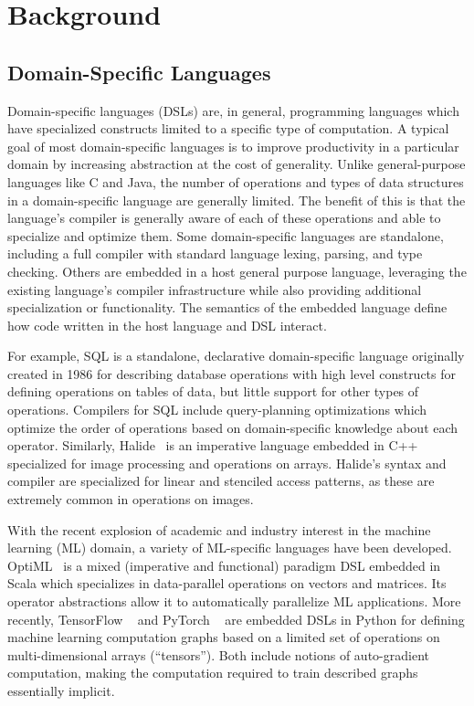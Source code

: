\chapter{Background}
\label{background}

\section{Domain-Specific Languages}
Domain-specific languages (DSLs) are, in general, programming languages which have specialized
constructs limited to a specific type of computation. A typical goal of
most domain-specific languages is to improve productivity in a particular domain
by increasing abstraction at the cost of generality. Unlike general-purpose languages like C and Java,
the number of operations and types of data structures in a domain-specific language
are generally limited. The benefit of this is that the language's compiler is
generally aware of each of these operations and able to specialize and optimize them.
Some domain-specific languages are standalone, including a full compiler with standard language
lexing, parsing, and type checking. Others are embedded in a host general purpose language,
leveraging the existing language's compiler infrastructure while also
providing additional specialization or functionality. The semantics of the embedded language
define how code written in the host language and DSL interact.

For example, SQL is a standalone, declarative
domain-specific language originally created in 1986 for describing database operations with high level constructs
for defining operations on tables of data, but little support for other types of operations.
Compilers for SQL include query-planning optimizations which optimize the order of
operations based on domain-specific knowledge about each operator.
Similarly, Halide~\cite{pldi13halide} is an imperative language embedded in C++ specialized for image processing
and operations on arrays. Halide's syntax and compiler are specialized for linear and stenciled access patterns,
as these are extremely common in operations on images.

With the recent explosion of academic and industry interest in the machine learning (ML) domain,
a variety of ML-specific languages have been developed.
OptiML~\cite{optiml} is a mixed (imperative and functional) paradigm DSL embedded in Scala
which specializes in data-parallel operations on vectors and matrices.
Its operator abstractions allow it to automatically parallelize ML applications.
More recently, TensorFlow ~\cite{tensorflow} and PyTorch ~\cite{pytorch} are
embedded DSLs in Python for defining machine learning computation graphs based on
a limited set of operations on multi-dimensional arrays (``tensors''). Both include
notions of auto-gradient computation, making the computation required to
train described graphs essentially implicit.

